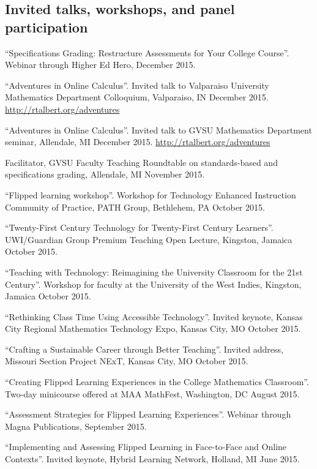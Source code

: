 \documentclass[letterpaper]{article}
\renewenvironment{itemize}{
  \begin{list}{}{
    \setlength{\leftmargin}{1.5em}
	\setlength{\itemsep}{0in}
  }
}{
  \end{list}
}
\begin{document}
\subsection*{Invited talks, workshops, and panel participation}
\begin{itemize}
	\item 
	\item ``Specifications Grading: Restructure Assessments for Your College Course''. Webinar through Higher Ed Hero, December 2015. 
	\item ``Adventures in Online Calculus''. Invited talk to Valparaiso University Mathematics Department Colloquium, Valparaiso, IN December 2015. \url{http://rtalbert.org/adventures}
	\item ``Adventures in Online Calculus''. Invited talk to GVSU Mathematics Department seminar, Allendale, MI December 2015. \url{http://rtalbert.org/adventures}
	\item Facilitator, GVSU Faculty Teaching Roundtable on standards-based and specifications grading, Allendale, MI November 2015. 
	\item ``Flipped learning workshop''. Workshop for Technology Enhanced Instruction Community of Practice, PATH Group, Bethlehem, PA October 2015. 
	\item ``Twenty-First Century Technology for Twenty-First Century Learners''. UWI/Guardian Group Premium Teaching Open Lecture, Kingston, Jamaica October 2015. 
	\item ``Teaching with Technology: Reimagining the University Classroom for the 21st Century''. Workshop for faculty at the University of the West Indies, Kingston, Jamaica October 2015. 
	\item ``Rethinking Class Time Using Accessible Technology''. Invited keynote, Kansas City Regional Mathematics Technology Expo, Kansas City, MO October 2015. 
	\item ``Crafting a Sustainable Career through Better Teaching''. Invited address, Missouri Section Project NExT, Kansas City, MO October 2015. 
	\item ``Creating Flipped Learning Experiences in the College Mathematics Classroom''. Two-day minicourse offered at MAA MathFest, Washington, DC August 2015. 
	\item ``Assessment Strategies for Flipped Learning Experiences''. Webinar through Magna Publications, September 2015.
	\item ``Implementing and Assessing Flipped Learning in Face-to-Face and Online Contexts''. Invited keynote, Hybrid Learning Network, Holland, MI June 2015. 

\end{itemize}
\end{document}
